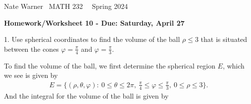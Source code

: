 \documentclass{report}
\title{\Huge{}}
\author{\huge{Nathan Warner}}
\date{\huge{}}
\begin{document}
    \pagebreak \bigbreak \noindent
    Nate Warner \ \quad \quad \quad \quad \quad \quad \quad \quad \quad \quad \quad \quad  MATH 232 \quad  \quad \quad \quad \quad \quad \quad \quad \quad \ \ \quad \quad Spring 2024
    \begin{center}
        \textbf{Homework/Worksheet 10 - Due: Saturday, April 27}
    \end{center}
    \bigbreak \noindent 
    \begin{mdframed}
        1. Use spherical coordinates to find the volume of the ball $\rho \leq 3$ that is situated between the cones $\varphi = \frac{\pi}{4}$ and $\varphi = \frac{\pi}{3}$.
    \end{mdframed}
    \bigbreak \noindent 
    To find the volume of the ball, we first determine the spherical region $E$, which we see is given by
    \begin{align*}
        E = \{(\rho, \theta, \varphi):\ 0 \leq \theta  \leq 2\pi,\ \frac{\pi}{4} \leq \varphi \leq \frac{\pi}{3},\ 0 \leq \rho \leq 3\}
    .\end{align*}
    \bigbreak \noindent 
    And the integral for the volume of the ball is given by
\end{document}
